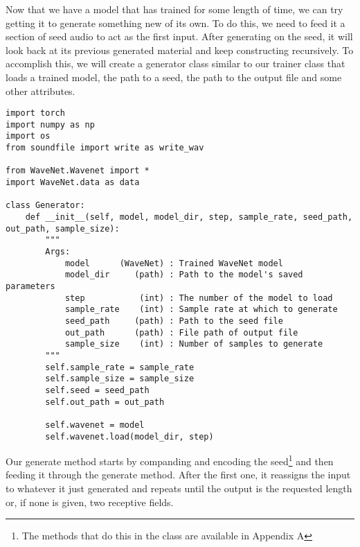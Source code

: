 Now that we have a model that has trained for some length of time, we can try getting it to generate something new of its own. To do this, we need to feed it a section of seed audio to act as the first input. After generating on the seed, it will look back at its previous generated material and keep constructing recursively. To accomplish this, we will create a generator class similar to our trainer class that loads a trained model, the path to a seed, the path to the output file and some other attributes.

\begin{verbatim}
import torch
import numpy as np
import os
from soundfile import write as write_wav

from WaveNet.Wavenet import *
import WaveNet.data as data

class Generator:
    def __init__(self, model, model_dir, step, sample_rate, seed_path, out_path, sample_size):
        """
        Args:
            model      (WaveNet) : Trained WaveNet model 
            model_dir     (path) : Path to the model's saved parameters
            step           (int) : The number of the model to load
            sample_rate    (int) : Sample rate at which to generate 
            seed_path     (path) : Path to the seed file 
            out_path      (path) : File path of output file 
            sample_size    (int) : Number of samples to generate
        """
        self.sample_rate = sample_rate
        self.sample_size = sample_size
        self.seed = seed_path
        self.out_path = out_path

        self.wavenet = model
        self.wavenet.load(model_dir, step)
\end{verbatim}

\newpage
Our generate method starts by companding and encoding the seed\footnote{The methods that do this in the  class are available in Appendix A} and then feeding it through the generate method. After the first one, it reassigns the input to whatever it just generated and repeats until the output is the requested length or, if none is given, two receptive fields.

